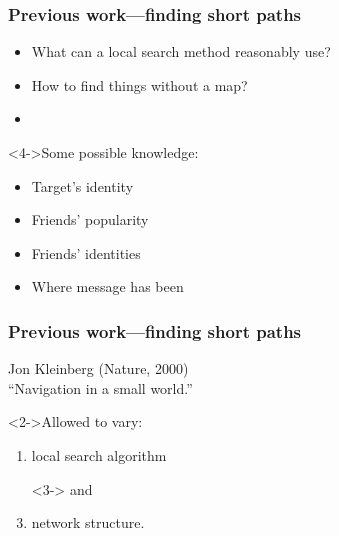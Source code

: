 \begin{frame}
  \frametitle{Previous work---finding short paths}

  \begin{itemize}
  \item<1-> What can a local search method reasonably use?
  \item<2->  How to find things without a map?
  \item<3-> 
  \end{itemize}
  
  \bigskip

  \begin{block}<4->{Some possible knowledge:}
    \begin{itemize}
    \item<1-> Target's identity
    \item<1-> Friends' popularity 
    \item<1-> Friends' identities 
    \item<1-> Where message has been 
    \end{itemize}
  \end{block}

\end{frame}

\begin{frame}
  \frametitle{Previous work---finding short paths}

  Jon Kleinberg (Nature, 2000)\cite{kleinberg2000a}\\
   ``Navigation in a small world.''

   \bigskip
   
   \begin{block}<2->{Allowed to vary:}
     \begin{enumerate}
     \item<2-> local search algorithm
     \item[]<3-> and
     \item<3-> network structure.
     \end{enumerate}
   \end{block}

\end{frame}

